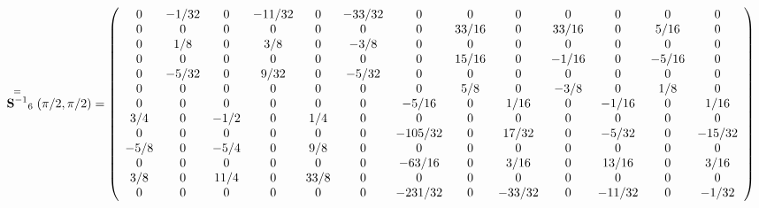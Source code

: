 {\scriptsize
\begin{equation} \label{eq:R6}
\V{S^{-1}}_6(\pi/2,\pi/2) = \left(
\begin{array}{ccccccccccccc}
   0 &  -1/32 &      0 & -11/32 &      0 & -33/32 &      0 &      0 &      0 &      0 &      %
0 &      0 &      0 \\
   0 &      0 &      0 &      0 &      0 &      0 &      0 &  33/16 &      0 &  33/16 &      %
0 &   5/16 &      0 \\
   0 &    1/8 &      0 &    3/8 &      0 &   -3/8 &      0 &      0 &      0 &      0 &      %
0 &      0 &      0 \\
   0 &      0 &      0 &      0 &      0 &      0 &      0 &  15/16 &      0 &  -1/16 &      %
0 &  -5/16 &      0 \\
   0 &  -5/32 &      0 &   9/32 &      0 &  -5/32 &      0 &      0 &      0 &      0 &      %
0 &      0 &      0 \\
   0 &      0 &      0 &      0 &      0 &      0 &      0 &    5/8 &      0 &   -3/8 &      %
0 &    1/8 &      0 \\
   0 &      0 &      0 &      0 &      0 &      0 &  -5/16 &      0 &   1/16 &      0 &  %
-1/16 &      0 &   1/16 \\
 3/4 &      0 &   -1/2 &      0 &    1/4 &      0 &      0 &      0 &      0 &      0 &      %
0 &      0 &      0 \\
   0 &      0 &      0 &      0 &      0 &      0 &-105/32 &      0 &  17/32 &      0 &  %
-5/32 &      0 & -15/32 \\
-5/8 &      0 &   -5/4 &      0 &    9/8 &      0 &      0 &      0 &      0 &      0 &      %
0 &      0 &      0 \\
   0 &      0 &      0 &      0 &      0 &      0 & -63/16 &      0 &   3/16 &      0 &  %
13/16 &      0 &   3/16 \\
 3/8 &      0 &   11/4 &      0 &   33/8 &      0 &      0 &      0 &      0 &      0 &      %
0 &      0 &      0 \\
   0 &      0 &      0 &      0 &      0 &      0 &-231/32 &      0 & -33/32 &      0 & %
-11/32 &      0 &  -1/32 \\
\end{array} \right)
\end{equation}
}



